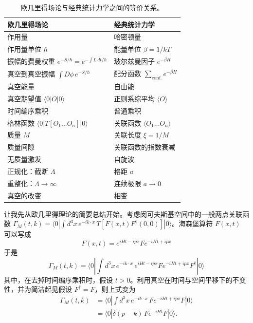 \begin{table}[htbp]
\centering
\caption{欧几里得场论与经典统计力学之间的等价关系。}
\label{tab:1}
\begin{tabular}{ll}
\toprule
\textbf{欧几里得场论} & \textbf{经典统计力学} \\
\midrule
作用量 & 哈密顿量 \\
作用量单位 $\hbar$ & 能量单位 $\beta = 1/kT$ \\
\shortstack{振幅的费曼权重 \\ $e^{-S/\hbar} = e^{-\int L\,dt/\hbar}$} & 玻尔兹曼因子 $e^{-\beta H}$ \\
\shortstack{真空到真空振幅 \\ $\int D\phi\, e^{-S/\hbar}$} & \shortstack{配分函数 \\ $\sum_{\mathrm{conf.}} e^{-\beta H}$} \\
真空能量 & 自由能 \\
真空期望值 $\langle 0|O|0\rangle$ & 正则系综平均 $\langle O\rangle$ \\
时间编序乘积 & 普通乘积 \\
格林函数 $\langle 0|T[O_1 \ldots O_n]|0\rangle$ & 关联函数 $\langle O_1 \ldots O_n\rangle$ \\
质量 $M$ & 关联长度 $\xi = 1/M$ \\
质量间隙 & 关联函数的指数衰减 \\
无质量激发 & 自旋波 \\
正规化：截断 $\Lambda$ & 格距 $a$ \\
重整化：$\Lambda \to \infty$ & 连续极限 $a \to 0$ \\
真空的改变 & 相变 \\
\bottomrule
\end{tabular}
\end{table}

让我先从欧几里得理论的简要总结开始。考虑闵可夫斯基空间中的一般两点关联函数 $\Gamma_M(t,k) = \langle 0| \int d^3x\, e^{-ik\cdot x}\, T[F(x,t)F^\dagger(0,0)] |0\rangle$。海森堡算符 $F(x,t)$ 可以写成
\begin{equation}
F(x,t) = e^{iHt-ipx} F e^{-iHt+ipx}
\label{eq:5.3}
\end{equation}
于是
\begin{equation}
\Gamma_M(t,k) = \langle 0| \int d^3x\, e^{-ik\cdot x}\, e^{iHt-ipx} F e^{-iHt+ipx} F^\dagger |0\rangle
\label{eq:5.4}
\end{equation}
其中，在去掉时间编序乘积时，假设 $t > 0$。利用真空在时间与空间平移下的不变性，并为简洁起见假设 $F^\dagger = F$，则上式变为
\begin{equation}
\begin{aligned}
\Gamma_M(t,k) &= \langle 0| \int d^3x\, e^{-ik\cdot x}\, F e^{-iHt+ipx} F |0\rangle \\
&= \langle 0| \delta(p-k)\, F e^{-iHt} F |0\rangle .
\end{aligned}
\label{eq:5.5}
\end{equation}

